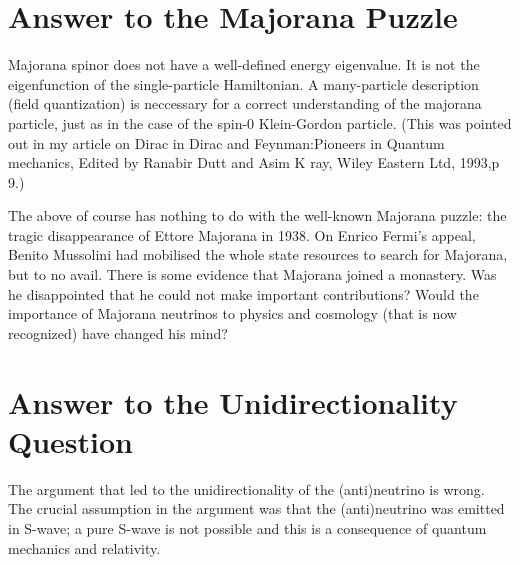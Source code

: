 \section*{Answer to the Majorana Puzzle}

Majorana spinor does not have a well-defined energy eigenvalue. It is not the eigenfunction of the single-particle Hamiltonian. A many-particle description (field quantization) is
neccessary for a correct understanding of the majorana particle, just as in the case of the
spin-0 Klein-Gordon particle. (This was pointed out in my article on Dirac in Dirac and
Feynman:Pioneers in Quantum mechanics, Edited by Ranabir Dutt and Asim K ray, Wiley
Eastern Ltd, 1993,p 9.)

The above of course has nothing to do with the well-known Majorana puzzle: the tragic
disappearance of Ettore Majorana in 1938. On Enrico Fermi’s appeal, Benito Mussolini
had mobilised the whole state resources to search for Majorana, but to no avail. There is
some evidence that Majorana joined a monastery. Was he disappointed that he could not
make important contributions? Would the importance of Majorana neutrinos to physics and
cosmology (that is now recognized) have changed his mind?

\section*{Answer to the Unidirectionality Question}

The argument that led to the unidirectionality of the (anti)neutrino is wrong. The crucial assumption in the argument was that the (anti)neutrino was emitted in S-wave; a pure
S-wave is not possible and this is a consequence of quantum mechanics and relativity.

